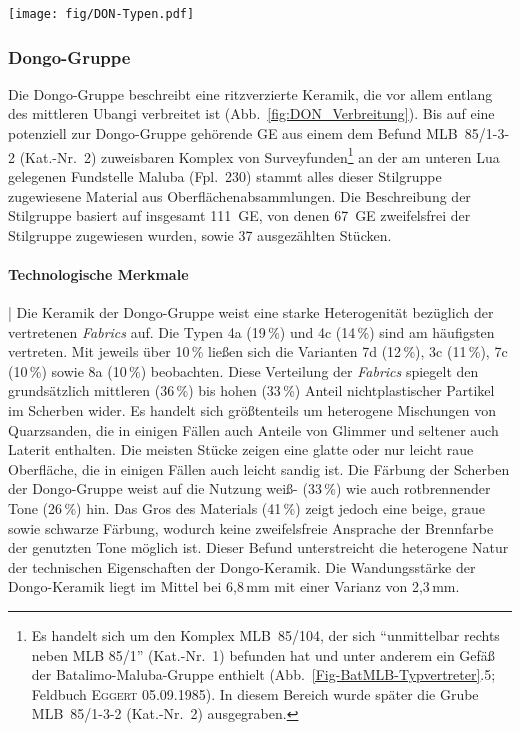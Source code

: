 \begin{figure*}[tb]
	\centering
	\texttt{[image: fig/DON-Typen.pdf]}
	\caption{Dongo-Gruppe: Typvertreter.\\1:~Taf.~9.7; 2:~Taf.~8.6; 3:~Taf.~9.8; 4:~Taf.~11.4; 5:~Taf.~7.13; 6:~Taf.~11.3; 7:~Taf.~10.6; 8:~Taf.~8.1; 9:~Taf.~7.14; 10:~Taf.~8.3; 11:~Taf.~10.3.}
	\label{fig:DON_Typverteter}
\end{figure*}

\subsubsection{Dongo-Gruppe}\label{sec:DON-Gr}

Die Dongo-Gruppe beschreibt eine ritzverzierte Keramik, die vor allem entlang des mittleren \mbox{Ubangi} verbreitet ist (Abb.~\ref{fig:DON_Verbreitung}). Bis auf eine potenziell zur Dongo-Gruppe gehörende GE aus einem dem Befund MLB~85/1-3-2 (Kat.-Nr.~2) zuweisbaren Komplex von Surveyfunden\footnote{Es handelt sich um den Komplex MLB~85/104, der sich \enquote{unmittelbar rechts neben MLB 85/1} (Kat.-Nr.~1) befunden hat und unter anderem ein Gefäß der Batalimo-Maluba-Gruppe enthielt (Abb.~\ref{Fig-BatMLB-Typvertreter}.5; Feldbuch \textsc{Eggert} 05.09.1985). In diesem Bereich wurde später die Grube MLB~85/1-3-2 (Kat.-Nr.~2) ausgegraben.} an der am unteren Lua gelegenen Fundstelle Maluba (Fpl.~230) stammt alles dieser Stilgruppe zugewiesene Material aus Oberflächenabsammlungen. Die Beschreibung der Stilgruppe basiert auf insgesamt 111~GE, von denen 67~GE zweifelsfrei der Stilgruppe zugewiesen wurden, sowie 37 ausgezählten Stücken. 

\paragraph{Technologische Merkmale}\hspace{-.5em}|\hspace{.5em}%
Die Keramik der Dongo-Gruppe weist eine starke Heterogenität bezüglich der vertretenen \textit{Fabrics} auf. Die Typen 4a (19\,\%) und 4c (14\,\%) sind am häufigsten vertreten. Mit jeweils über 10\,\% ließen sich die Varianten 7d (12\,\%), 3c (11\,\%), 7c (10\,\%) sowie 8a (10\,\%) beobachten. Diese Verteilung der \textit{Fabrics} spiegelt den grundsätzlich mittleren (36\,\%) bis hohen (33\,\%) Anteil nichtplastischer Partikel im Scherben wider. Es handelt sich größtenteils um heterogene Mischungen von Quarzsanden, die in einigen Fällen auch Anteile von Glimmer und seltener auch Laterit enthalten. Die meisten Stücke zeigen eine glatte oder nur leicht raue Oberfläche, die in einigen Fällen auch leicht sandig ist. Die Färbung der Scherben der Dongo-Gruppe weist auf die Nutzung weiß- (33\,\%) wie auch rotbrennender Tone (26\,\%) hin. Das Gros des Materials (41\,\%) zeigt jedoch eine beige, graue sowie schwarze Färbung, wodurch keine zweifelsfreie Ansprache der Brennfarbe der genutzten Tone möglich ist. Dieser Befund unterstreicht die heterogene Natur der technischen Eigenschaften der Dongo-Keramik. Die Wandungsstärke der Dongo-Keramik liegt im Mittel bei 6,8\,mm mit einer Varianz von 2,3\,mm.

